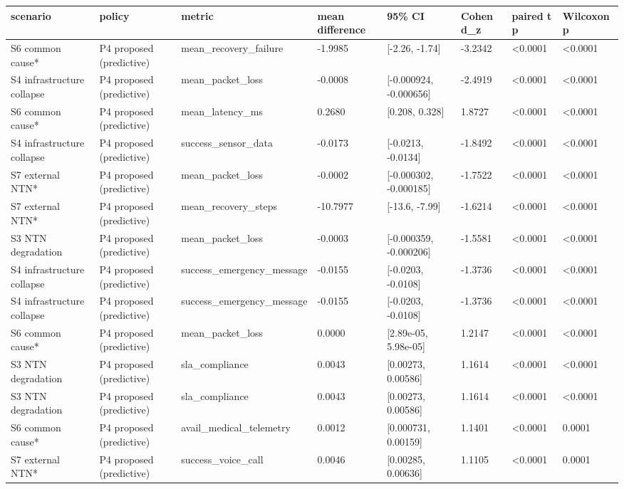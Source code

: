 \begin{tabular}{llllllll}
\toprule
scenario & policy & metric & mean difference & 95\% CI & Cohen d\_z & paired t p & Wilcoxon p \\
\midrule
S6 common cause* & P4 proposed (predictive) & mean\_recovery\_failure & -1.9985 & [-2.26, -1.74] & -3.2342 & <0.0001 & <0.0001 \\
S4 infrastructure collapse & P4 proposed (predictive) & mean\_packet\_loss & -0.0008 & [-0.000924, -0.000656] & -2.4919 & <0.0001 & <0.0001 \\
S6 common cause* & P4 proposed (predictive) & mean\_latency\_ms & 0.2680 & [0.208, 0.328] & 1.8727 & <0.0001 & <0.0001 \\
S4 infrastructure collapse & P4 proposed (predictive) & success\_sensor\_data & -0.0173 & [-0.0213, -0.0134] & -1.8492 & <0.0001 & <0.0001 \\
S7 external NTN* & P4 proposed (predictive) & mean\_packet\_loss & -0.0002 & [-0.000302, -0.000185] & -1.7522 & <0.0001 & <0.0001 \\
S7 external NTN* & P4 proposed (predictive) & mean\_recovery\_steps & -10.7977 & [-13.6, -7.99] & -1.6214 & <0.0001 & <0.0001 \\
S3 NTN degradation & P4 proposed (predictive) & mean\_packet\_loss & -0.0003 & [-0.000359, -0.000206] & -1.5581 & <0.0001 & <0.0001 \\
S4 infrastructure collapse & P4 proposed (predictive) & success\_emergency\_message & -0.0155 & [-0.0203, -0.0108] & -1.3736 & <0.0001 & <0.0001 \\
S4 infrastructure collapse & P4 proposed (predictive) & success\_emergency\_message & -0.0155 & [-0.0203, -0.0108] & -1.3736 & <0.0001 & <0.0001 \\
S6 common cause* & P4 proposed (predictive) & mean\_packet\_loss & 0.0000 & [2.89e-05, 5.98e-05] & 1.2147 & <0.0001 & <0.0001 \\
S3 NTN degradation & P4 proposed (predictive) & sla\_compliance & 0.0043 & [0.00273, 0.00586] & 1.1614 & <0.0001 & <0.0001 \\
S3 NTN degradation & P4 proposed (predictive) & sla\_compliance & 0.0043 & [0.00273, 0.00586] & 1.1614 & <0.0001 & <0.0001 \\
S6 common cause* & P4 proposed (predictive) & avail\_medical\_telemetry & 0.0012 & [0.000731, 0.00159] & 1.1401 & <0.0001 & 0.0001 \\
S7 external NTN* & P4 proposed (predictive) & success\_voice\_call & 0.0046 & [0.00285, 0.00636] & 1.1105 & <0.0001 & 0.0001 \\

\end{tabular}
